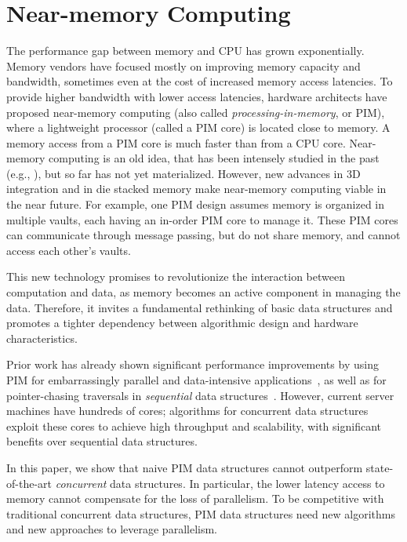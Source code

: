 \section{Near-memory Computing}

The performance gap between memory and CPU has grown exponentially. Memory vendors have focused mostly on improving memory capacity and bandwidth, sometimes even at the cost of increased memory access latencies. To provide higher bandwidth with lower access latencies, hardware architects have proposed near-memory computing (also called \textit{processing-in-memory}, or PIM), where a lightweight processor (called a PIM core) is located close to memory. A memory access from a PIM core is much faster than from a CPU core. 
Near-memory computing is an old idea, that has been intensely studied in the past 
(e.g., \cite{Stone1970, Kogge1994, Gokhale1995, Patterson1997, Oskin1998, KangHYKGLTP99, Hall1999}), 
but so far has not yet materialized. However, new advances in 3D integration and in die stacked memory make near-memory computing viable in the near future. 
For example, one PIM design assumes memory is organized in multiple vaults, each having an in-order PIM core to manage it. These PIM cores
can communicate through message passing, but do not share memory, and cannot access each other's vaults. 

This new technology promises to revolutionize the interaction between computation and data, as memory becomes an active component in managing the data. Therefore, it invites a fundamental rethinking of basic data structures and promotes a tighter dependency between algorithmic design and hardware characteristics. 

Prior work has already shown significant performance improvements by using PIM for embarrassingly parallel 
and data-intensive applications~\cite{Zhang2014:TTP, Ahn2015:2, ZhuASSHPF13, Akin2015:DRM}, 
as well as for pointer-chasing traversals in \emph{sequential} data structures~\cite{hsieh2016accelerating}. 
However, current server machines have hundreds of cores; algorithms for 
concurrent data structures exploit these cores to achieve high throughput and 
scalability, with significant benefits over sequential data structures. 

In this paper, we show that
  naive PIM data structures cannot outperform 
 state-of-the-art \emph{concurrent} data structures. In particular, 
the lower latency access to memory cannot compensate for the loss of 
parallelism. To be competitive with traditional concurrent data structures, 
PIM data structures need new algorithms and new approaches to leverage parallelism.  

